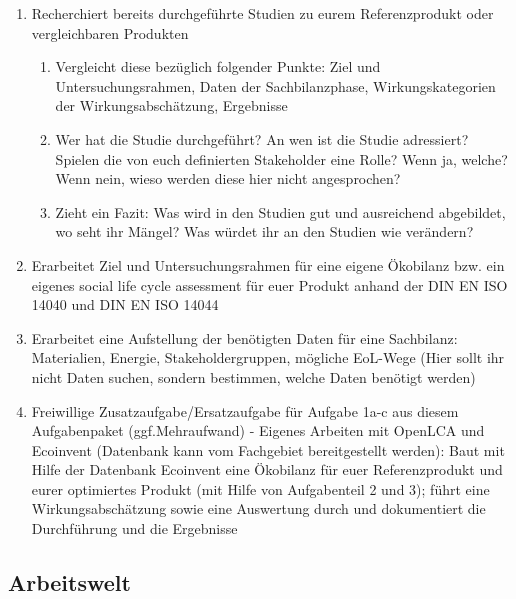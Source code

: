 \documentclass[headinclude=true]{scrartcl}
\begin{document}
\begin{enumerate}
	\item
	      Recherchiert bereits durchgeführte Studien zu eurem Referenzprodukt oder vergleichbaren Produkten

	      \begin{enumerate}
		      \item
		            Vergleicht diese bezüglich folgender Punkte: Ziel und
		            Untersuchungsrahmen, Daten der Sachbilanzphase, Wirkungskategorien
		            der Wirkungsabschätzung, Ergebnisse
		      \item
		            Wer hat die Studie durchgeführt? An wen ist die Studie adressiert?
		            Spielen die von euch definierten Stakeholder eine Rolle? Wenn ja, welche? Wenn nein, wieso werden
		            diese hier nicht angesprochen?
		      \item
		            Zieht ein Fazit: Was wird in den Studien gut und ausreichend abgebildet, wo seht ihr Mängel? Was würdet ihr an den Studien wie verändern?
	      \end{enumerate}
	\item
	      Erarbeitet Ziel und Untersuchungsrahmen für eine eigene Ökobilanz bzw.
	      ein eigenes social life cycle assessment für euer Produkt anhand der DIN EN ISO 14040 und DIN EN ISO 14044
	\item
	      Erarbeitet eine Aufstellung der benötigten Daten für eine Sachbilanz: Materialien, Energie, Stakeholdergruppen, mögliche EoL-Wege (Hier sollt ihr nicht Daten suchen, sondern bestimmen, welche Daten benötigt werden)
	\item
	      Freiwillige Zusatzaufgabe/Ersatzaufgabe für Aufgabe 1a-c aus diesem Aufgabenpaket (ggf.Mehraufwand) - Eigenes Arbeiten mit OpenLCA und Ecoinvent (Datenbank kann vom Fachgebiet bereitgestellt werden): Baut mit Hilfe der Datenbank Ecoinvent eine Ökobilanz für euer Referenzprodukt und eurer optimiertes Produkt (mit Hilfe von Aufgabenteil 2 und 3); führt eine Wirkungsabschätzung sowie eine Auswertung durch und dokumentiert die Durchführung und die Ergebnisse
\end{enumerate}

\subsection{Arbeitswelt}
\label{Arbeitswelt}
\end{document}
